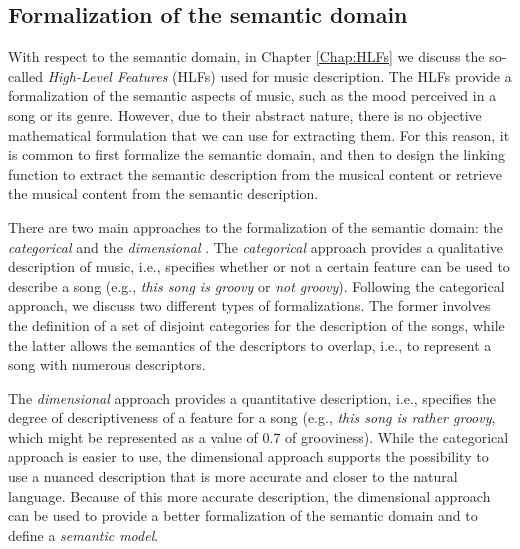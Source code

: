 \subsection{Formalization of the semantic domain}

With respect to the semantic domain, in Chapter \ref{Chap:HLFs} we discuss the so-called \textit{High-Level Features} (HLFs) \cite{Le2013} used for music description. The HLFs provide a formalization of the semantic aspects of music, such as the mood perceived in a song or its genre. However, due to their abstract nature, there is no objective mathematical formulation that we can use for extracting them.
For this reason, it is common to first formalize the semantic domain, and then to design the linking function to extract the semantic description from the musical content or retrieve the musical content from the semantic description.

There are two main approaches to the formalization of the semantic domain: the \textit{categorical} and the \textit{dimensional} \cite{Sordo2012}. The \textit{categorical} approach provides a qualitative description of music, i.e., specifies whether or not a certain feature can be used to describe a song (e.g., \textit{this song is groovy} or \textit{not groovy}). Following the categorical approach, we discuss two different types of formalizations. The former involves the definition of a set of disjoint categories for the description of the songs, while the latter allows the semantics of the descriptors to overlap, i.e., to represent a song with numerous descriptors.

The \textit{dimensional} approach provides a quantitative description, i.e., specifies the degree of descriptiveness of a feature for a song (e.g., \textit{this song is rather groovy}, which might be represented as a value of 0.7 of grooviness). While the categorical approach is easier to use, the dimensional approach supports the possibility to use a nuanced description that is more accurate and closer to the natural language. Because of this more accurate description, the dimensional approach can be used to provide a better formalization of the semantic domain and to define a \textit{semantic model}. 

